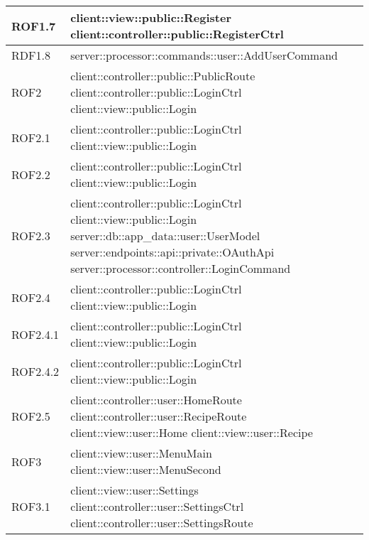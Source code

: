 \begin{center}
\begin{longtable}{| p{2.5cm} | p{11cm} |}
\hline
ROF1.7 & client::view::public::Register \newline client::controller::public::RegisterCtrl \\
\hline
RDF1.8 & server::processor::commands::user::AddUserCommand \\
\hline
ROF2 & client::controller::public::PublicRoute \newline client::controller::public::LoginCtrl \newline client::view::public::Login \\
\hline
ROF2.1 & client::controller::public::LoginCtrl \newline client::view::public::Login \\
\hline
ROF2.2 & client::controller::public::LoginCtrl \newline client::view::public::Login \\
\hline
ROF2.3 & client::controller::public::LoginCtrl \newline client::view::public::Login \newline server::db::app\_data::user::UserModel \newline server::endpoints::api::private::OAuthApi \newline server::processor::controller::LoginCommand \\
\hline
ROF2.4 & client::controller::public::LoginCtrl \newline client::view::public::Login \\
\hline
ROF2.4.1 & client::controller::public::LoginCtrl \newline client::view::public::Login \\
\hline
ROF2.4.2 & client::controller::public::LoginCtrl \newline client::view::public::Login \\
\hline
ROF2.5 & client::controller::user::HomeRoute \newline client::controller::user::RecipeRoute \newline client::view::user::Home \newline client::view::user::Recipe \\
\hline
ROF3 & client::view::user::MenuMain \newline client::view::user::MenuSecond \\
\hline
ROF3.1 & client::view::user::Settings \newline client::controller::user::SettingsCtrl \newline client::controller::user::SettingsRoute \\

\end{longtable}
\end{center}
